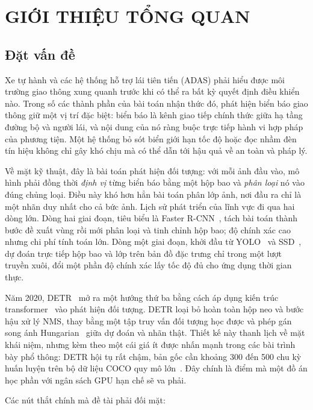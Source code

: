 \chapter{GIỚI THIỆU TỔNG QUAN}
\label{ch:gioi_thieu}

\section{Đặt vấn đề}

Xe tự hành và các hệ thống hỗ trợ lái tiên tiến (ADAS) phải hiểu được môi trường giao thông xung
quanh trước khi có thể ra bất kỳ quyết định điều khiển nào. Trong số các thành phần của bài toán
nhận thức đó, phát hiện biển báo giao thông giữ một vị trí đặc biệt: biển báo là kênh giao tiếp
chính thức giữa hạ tầng đường bộ và người lái, và nội dung của nó ràng buộc trực tiếp hành vi hợp
pháp của phương tiện. Một hệ thống bỏ sót biển giới hạn tốc độ hoặc đọc nhầm đèn tín hiệu không
chỉ gây khó chịu mà có thể dẫn tới hậu quả về an toàn và pháp lý.

Về mặt kỹ thuật, đây là bài toán phát hiện đối tượng: với mỗi ảnh đầu vào, mô hình phải đồng thời
\emph{định vị} từng biển báo bằng một hộp bao và \emph{phân loại} nó vào đúng chủng loại. Điều này
khó hơn hẳn bài toán phân lớp ảnh, nơi đầu ra chỉ là một nhãn duy nhất cho cả bức ảnh. Lịch sử
phát triển của lĩnh vực đi qua hai dòng lớn. Dòng hai giai đoạn, tiêu biểu là Faster
R-CNN~\cite{ren2017fasterrcnn}, tách bài toán thành bước đề xuất vùng rồi mới phân loại và tinh
chỉnh hộp bao; độ chính xác cao nhưng chi phí tính toán lớn. Dòng một giai đoạn, khởi đầu từ
YOLO~\cite{redmon2016yolo} và SSD~\cite{liu2016ssd}, dự đoán trực tiếp hộp bao và lớp trên bản đồ
đặc trưng chỉ trong một lượt truyền xuôi, đổi một phần độ chính xác lấy tốc độ đủ cho ứng dụng
thời gian thực.

Năm 2020, DETR~\cite{carion2020detr} mở ra một hướng thứ ba bằng cách áp dụng kiến trúc
transformer~\cite{vaswani2017attention} vào phát hiện đối tượng. DETR loại bỏ hoàn toàn hộp neo
và bước hậu xử lý NMS, thay bằng một tập truy vấn đối tượng học được và phép gán song ánh
Hungarian~\cite{kuhn1955hungarian} giữa dự đoán và nhãn thật. Thiết kế này thanh lịch về mặt khái
niệm, nhưng kèm theo một cái giá ít được nhấn mạnh trong các bài trình bày phổ thông: DETR hội tụ
rất chậm, bản gốc cần khoảng 300 đến 500 chu kỳ huấn luyện trên bộ dữ liệu COCO quy
mô lớn~\cite{lin2014coco}. Đây chính là điểm mà một đồ án học phần với ngân sách GPU hạn chế sẽ
va phải.

Các nút thắt chính mà đề tài phải đối mặt:

